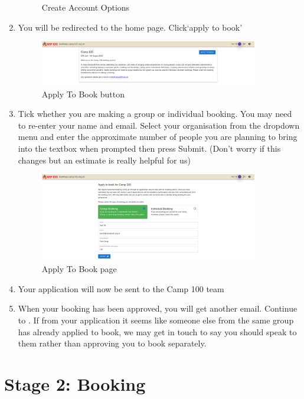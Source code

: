 \documentclass[a4paper, 11pt]{report}
\begin{document}
\begin{enumerate}
\begin{figure}[H]
        \caption{Create Account Options}
    \end{figure}
    \item You will be redirected to the home page. Click`apply to book'
    \begin{figure}[H]
        \centering
        \includegraphics[width=0.9\textwidth]{assets/1-homepage-loggedin.png}
        \caption{Apply To Book button}
    \end{figure}
    \item Tick whether you are making a group or individual booking. You may need to re-enter your name and email. Select your organisation from the dropdown menu and enter the approximate number of people you are planning to bring into the textbox when prompted then press Submit. (Don't worry if this changes but an estimate is really helpful for us)
    \begin{figure}[H]
        \centering
        \includegraphics[width=0.9\textwidth]{assets/1-apply.png}
        \caption{Apply To Book page}
    \end{figure}
    \item Your application will now be sent to the Camp 100 team
    \item When your booking has been approved, you will get another email. Continue to . If from your application it seems like someone else from the same group has already applied to book, we may get in touch to say you should speak to them rather than approving you to book separately.
\end{enumerate}



\chapter{Stage 2: Booking}
\label{chap:booking}
\end{document}
